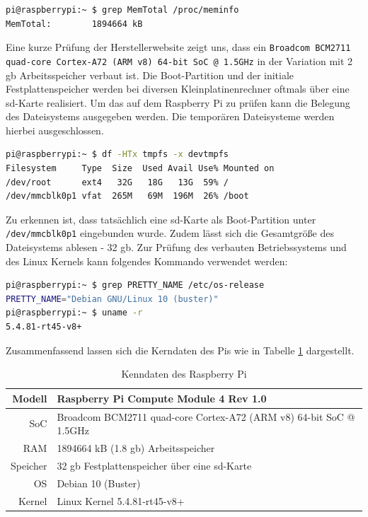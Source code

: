 \begin{lstlisting}[language=sh, label=lst:pi-ram]
pi@raspberrypi:~ $ grep MemTotal /proc/meminfo
MemTotal:        1894664 kB
\end{lstlisting}

\noindent Eine kurze Prüfung der Herstellerwebsite zeigt uns, dass ein \texttt{Broadcom BCM2711 quad-\allowbreak core Cortex-\allowbreak A72 (ARM v8) 64-bit SoC @ 1.5GHz}
in der Variation mit \num{2} \gls{gb} Arbeitsspeicher verbaut ist.
Die Boot-Partition und der initiale Festplattenspeicher werden bei diversen Kleinplatinenrechner oftmals über eine \gls{sd}-Karte
realisiert.
Um das auf dem Raspberry Pi zu prüfen kann die Belegung des Dateisystems ausgegeben werden.
Die temporären Dateisysteme werden hierbei ausgeschlossen.

\begin{lstlisting}[language=sh, label=lst:pi-sd]
pi@raspberrypi:~ $ df -HTx tmpfs -x devtmpfs
Filesystem     Type  Size  Used Avail Use% Mounted on
/dev/root      ext4   32G   18G   13G  59% /
/dev/mmcblk0p1 vfat  265M   69M  196M  26% /boot
\end{lstlisting}

\noindent Zu erkennen ist, dass tatsächlich eine \gls{sd}-Karte als Boot-Partition unter \texttt{/dev/mmcblk0p1} eingebunden wurde.
Zudem lässt sich die Gesamtgröße des Dateisystems ablesen - \num{32} \gls{gb}.
Zur Prüfung des verbauten Betriebssystems und des Linux Kernels kann folgendes Kommando verwendet werden:

\begin{lstlisting}[language=sh, label=lst:pi-os]
pi@raspberrypi:~ $ grep PRETTY_NAME /etc/os-release
PRETTY_NAME="Debian GNU/Linux 10 (buster)"
pi@raspberrypi:~ $ uname -r
5.4.81-rt45-v8+
\end{lstlisting}

\noindent Zusammenfassend lassen sich die Kerndaten des Pis wie in Tabelle \ref{tab:data-raspi} dargestellt.

\begin{table}[h]
    \centering
    \begin{tabularx}{\textwidth}{|r|X|}
        \hline
        Modell   & Raspberry Pi Compute Module 4 Rev 1.0                              \\ \hline
        SoC      & Broadcom BCM2711 quad-core Cortex-A72 (ARM v8) 64-bit SoC @ 1.5GHz \\ \hline
        RAM      & \num{1894664} kB (\num{1,8} \gls{gb}) Arbeitsspeicher              \\ \hline
        Speicher & \num{32} \gls{gb} Festplattenspeicher über eine \gls{sd}-Karte     \\ \hline
        OS       & Debian 10 (Buster)                                                 \\ \hline
        Kernel   & Linux Kernel 5.4.81-rt45-v8+                                       \\ \hline
    \end{tabularx}\caption{Kenndaten des Raspberry Pi}\label{tab:data-raspi}
\end{table}

